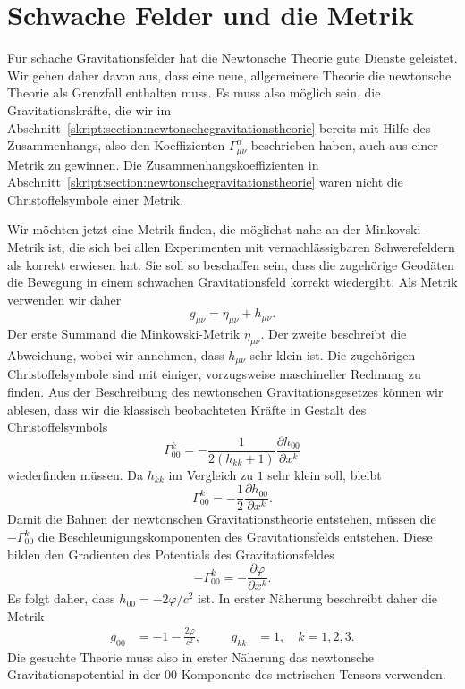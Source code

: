 \section{Schwache Felder und die Metrik}
Für schache Gravitationsfelder hat die Newtonsche Theorie gute Dienste
geleistet. 
Wir gehen daher davon aus, dass eine neue, allgemeinere Theorie die
newtonsche Theorie als Grenzfall enthalten muss.
Es muss also möglich sein, die Gravitationskräfte, die wir im 
Abschnitt~\ref{skript:section:newtonschegravitationstheorie} bereits
mit Hilfe des Zusammenhangs, also den Koeffizienten $\Gamma^\alpha_{\mu\nu}$
beschrieben haben, auch aus einer Metrik zu gewinnen.
Die Zusammenhangskoeffizienten in
Abschnitt~\ref{skript:section:newtonschegravitationstheorie} waren nicht
die Christoffelsymbole einer Metrik.

Wir möchten jetzt eine Metrik finden, die möglichst nahe an der
Minkovski-Metrik ist, die sich bei allen Experimenten mit
vernachlässigbaren Schwerefeldern als korrekt erwiesen hat.
Sie soll so beschaffen sein, dass die zugehörige Geodäten die
Bewegung in einem schwachen Gravitationsfeld korrekt wiedergibt.
Als Metrik verwenden wir daher
\[
g_{\mu\nu}=\eta_{\mu\nu} + h_{\mu\nu}.
\]
Der erste Summand die Minkowski-Metrik $\eta_{\mu\nu}$.
Der zweite beschreibt die Abweichung, wobei wir annehmen,
dass $h_{\mu\nu}$ sehr klein ist.
Die zugehörigen Christoffelsymbole sind mit einiger, vorzugsweise
maschineller Rechnung zu finden.
Aus der Beschreibung des newtonschen Gravitationsgesetzes können wir
ablesen, dass wir die klassisch beobachteten Kräfte in Gestalt
des Christoffelsymbols
\[
\Gamma^{k}_{00}
=
-\frac{1}{2(h_{kk} + 1)}\frac{\partial h_{00}}{\partial x^k}
\]
wiederfinden müssen.
Da $h_{kk}$ im Vergleich zu $1$ sehr klein soll, bleibt
\[
\Gamma^{k}_{00}
=
-\frac{1}{2}\frac{\partial h_{00}}{\partial x^k}.
\]
Damit die Bahnen der newtonschen Gravitationstheorie entstehen, müssen
die $-\Gamma^k_{00}$ die Beschleunigungskomponenten des Gravitationsfelds
entstehen.
Diese bilden den Gradienten des Potentials des Gravitationsfeldes
\[
-\Gamma^k_{00} = -\frac{\partial\varphi}{\partial x^k}.
\]
Es folgt daher, dass $h_{00}=-2\varphi/c^2$ ist.
In erster Näherung beschreibt daher die Metrik
\begin{equation}
\begin{aligned}
g_{00} &= -1 -\frac{2\varphi}{c^2},
&&&
g_{kk} &= 1,\quad k=1,2,3.
\end{aligned}
\label{skript:gravitation:naeherung}
\end{equation}
Die gesuchte Theorie muss also in erster Näherung das newtonsche
Gravitationspotential in der $00$-Komponente des metrischen Tensors
verwenden.

